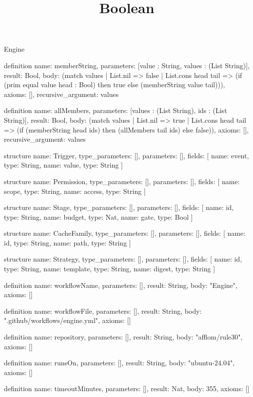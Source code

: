 \begin{lexlean}{Engine}
\title{Boolean}
\begin{semanticmodule}
definition{
  name: memberString,
  parameters: [value : String, values : (List String)],
  result: Bool,
  body: (match values
    | List.nil => false
    | List.cons head tail => (if (prim equal value head : Bool) then true else (memberString value tail))),
  axioms: [],
  recursive_argument: values
}

definition{
  name: allMembers,
  parameters: [values : (List String), ids : (List String)],
  result: Bool,
  body: (match values
    | List.nil => true
    | List.cons head tail => (if (memberString head ids) then (allMembers tail ids) else false)),
  axioms: [],
  recursive_argument: values
}

structure{
  name: Trigger,
  type_parameters: [],
  parameters: [],
  fields: [
    {name: event, type: String},
    {name: value, type: String}
  ]
}

structure{
  name: Permission,
  type_parameters: [],
  parameters: [],
  fields: [
    {name: scope, type: String},
    {name: access, type: String}
  ]
}

structure{
  name: Stage,
  type_parameters: [],
  parameters: [],
  fields: [
    {name: id, type: String},
    {name: budget, type: Nat},
    {name: gate, type: Bool}
  ]
}

structure{
  name: CacheFamily,
  type_parameters: [],
  parameters: [],
  fields: [
    {name: id, type: String},
    {name: path, type: String}
  ]
}

structure{
  name: Strategy,
  type_parameters: [],
  parameters: [],
  fields: [
    {name: id, type: String},
    {name: template, type: String},
    {name: digest, type: String}
  ]
}

definition{
  name: workflowName,
  parameters: [],
  result: String,
  body: "Engine",
  axioms: []
}

definition{
  name: workflowFile,
  parameters: [],
  result: String,
  body: ".github/workflows/engine.yml",
  axioms: []
}

definition{
  name: repository,
  parameters: [],
  result: String,
  body: "afflom/rule30",
  axioms: []
}

definition{
  name: runsOn,
  parameters: [],
  result: String,
  body: "ubuntu-24.04",
  axioms: []
}

definition{
  name: timeoutMinutes,
  parameters: [],
  result: Nat,
  body: 355,
  axioms: []
}


\end{semanticmodule}
\end{lexlean}
